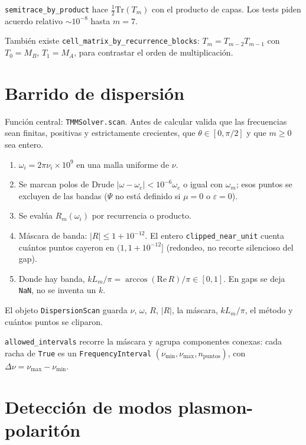 \documentclass[11pt,a4paper]{article}
\begin{document}
\texttt{semitrace\_by\_product} hace \(\frac12\mathrm{Tr}(T_m)\) con el
producto de capas. Los tests piden acuerdo relativo \(\sim 10^{-8}\) hasta
\(m=7\).

También existe \texttt{cell\_matrix\_by\_recurrence\_blocks}:
\(T_m=T_{m-2}T_{m-1}\) con \(T_0=M_B\), \(T_1=M_A\), para contrastar el
orden de multiplicación.

\section{Barrido de dispersión}
\label{sec:scan}

Función central: \texttt{TMMSolver.scan}. Antes de calcular valida que las
frecuencias sean finitas, positivas y estrictamente crecientes, que
\(\theta\in[0,\pi/2]\) y que \(m\ge 0\) sea entero.

\begin{enumerate}
\item \(\omega_i=2\pi\nu_i\times 10^9\) en una malla uniforme de \(\nu\).
\item Se marcan polos de Drude
\(\lvert\omega-\omega_e\rvert<10^{-6}\omega_e\) o igual con \(\omega_m\);
esos puntos se excluyen de las bandas (\(\Psi\) no está definido si
\(\mu=0\) o \(\varepsilon=0\)).
\item Se evalúa \(R_m(\omega_i)\) por recurrencia o producto.
\item Máscara de banda: \(\lvert R\rvert\le 1+10^{-12}\). El entero
\texttt{clipped\_near\_unit} cuenta cuántos puntos cayeron en
\((1,1+10^{-12}]\) (redondeo, no recorte silencioso del gap).
\item Donde hay banda,
\(k L_m/\pi=\arccos(\mathrm{Re}\,R)/\pi\in[0,1]\).
En gaps se deja \texttt{NaN}, no se inventa un \(k\).
\end{enumerate}

El objeto \texttt{DispersionScan} guarda \(\nu\), \(\omega\), \(R\),
\(\lvert R\rvert\), la máscara, \(k L_m/\pi\), el método y cuántos puntos se
cliparon.

\texttt{allowed\_intervals} recorre la máscara y agrupa componentes conexas:
cada racha de \texttt{True} es un \texttt{FrequencyInterval}
\((\nu_{\min},\nu_{\max},n_{\mathrm{puntos}})\), con
\(\Delta\nu=\nu_{\max}-\nu_{\min}\).

\section{Detección de modos plasmon-polaritón}
\end{document}
